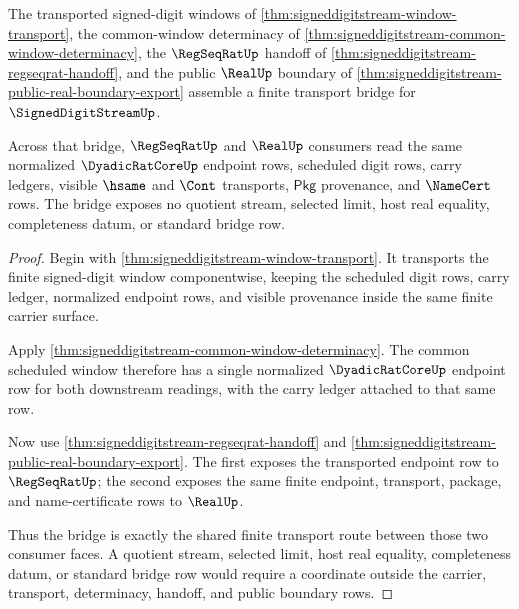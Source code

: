 \begin{theorem}
\label{thm:signeddigitstream-public-transport-bridge}
The transported signed-digit windows of
\autoref{thm:signeddigitstream-window-transport}, the common-window
determinacy of \autoref{thm:signeddigitstream-common-window-determinacy}, the
$\RegSeqRatUp$ handoff of \autoref{thm:signeddigitstream-regseqrat-handoff},
and the public $\RealUp$ boundary of
\autoref{thm:signeddigitstream-public-real-boundary-export} assemble a finite
transport bridge for $\SignedDigitStreamUp$.

Across that bridge, $\RegSeqRatUp$ and $\RealUp$ consumers read the same
normalized $\DyadicRatCoreUp$ endpoint rows, scheduled digit rows, carry
ledgers, visible $\hsame$ and $\Cont$ transports, $\mathsf{Pkg}$ provenance,
and $\NameCert$ rows. The bridge exposes no quotient stream, selected limit,
host real equality, completeness datum, or standard bridge row.
\end{theorem}
\begin{proof}
Begin with \autoref{thm:signeddigitstream-window-transport}. It transports the
finite signed-digit window componentwise, keeping the scheduled digit rows,
carry ledger, normalized endpoint rows, and visible provenance inside the same
finite carrier surface.

Apply \autoref{thm:signeddigitstream-common-window-determinacy}. The common
scheduled window therefore has a single normalized $\DyadicRatCoreUp$ endpoint
row for both downstream readings, with the carry ledger attached to that same
row.

Now use \autoref{thm:signeddigitstream-regseqrat-handoff} and
\autoref{thm:signeddigitstream-public-real-boundary-export}. The first exposes
the transported endpoint row to $\RegSeqRatUp$; the second exposes the same
finite endpoint, transport, package, and name-certificate rows to $\RealUp$.

Thus the bridge is exactly the shared finite transport route between those two
consumer faces. A quotient stream, selected limit, host real equality,
completeness datum, or standard bridge row would require a coordinate outside
the carrier, transport, determinacy, handoff, and public boundary rows.
\end{proof}

